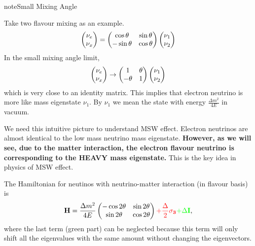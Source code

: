 \documentclass[letterpaper,12pt,english]{sphinxmanual}
\begin{document}
\begin{notice}{note}{Small Mixing Angle}

Take two flavour mixing as an example.
\begin{gather}
\begin{split}\begin{pmatrix}\nu_e \\ \nu_x\end{pmatrix} = \begin{pmatrix}  \cos\theta & \sin\theta \\ -\sin\theta  & \cos\theta \end{pmatrix}   \begin{pmatrix}\nu_1 \\ \nu_2\end{pmatrix}\end{split}\notag
\end{gather}
In the small mixing angle limit,
\begin{gather}
\begin{split}\begin{pmatrix}\nu_e \\ \nu_x\end{pmatrix} \to \begin{pmatrix}  1 & \theta \\ -\theta  & 1 \end{pmatrix}   \begin{pmatrix}\nu_1 \\ \nu_2\end{pmatrix}\end{split}\notag
\end{gather}
which is very close to an identity matrix. This implies that electron neutrino is more like mass eigenstate \(\nu_1\). By \(\nu_1\) we mean the state with energy \(\frac{ \Delta m^2 }{4E}\) in vacuum.

We need this intuitive picture to understand MSW effect. Electron neutrinos are almost identical to the low mass neutrino mass eigenstate. \textbf{However, as we will see, due to the matter interaction, the electron flavour neutrino is corresponding to the HEAVY mass eigenstate.} This is the key idea in physics of MSW effect.
\end{notice}

The Hamiltonian for neutinos with neutrino-matter interaction (in flavour basis) is
\begin{gather}
\begin{split}\mathbf H = \frac{ \Delta m^2 }{4E}\begin{pmatrix} -\cos 2\theta & \sin 2\theta \\ \sin 2\theta & \cos 2\theta \end{pmatrix}  {\color{red} + \frac{\Delta}{2} \mathbf {\sigma_3}}  {\color{green}+ \Delta \mathbf I},\end{split}\notag
\end{gather}
where the last term (green part) can be neglected because this term will only shift all the eigenvalues with the same amount without changing the eigenvectors.
\end{document}
